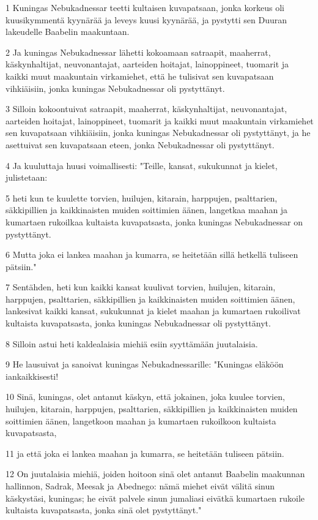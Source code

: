 \par 1 Kuningas Nebukadnessar teetti kultaisen kuvapatsaan, jonka korkeus oli kuusikymmentä kyynärää ja leveys kuusi kyynärää, ja pystytti sen Duuran lakeudelle Baabelin maakuntaan.
\par 2 Ja kuningas Nebukadnessar lähetti kokoamaan satraapit, maaherrat, käskynhaltijat, neuvonantajat, aarteiden hoitajat, lainoppineet, tuomarit ja kaikki muut maakuntain virkamiehet, että he tulisivat sen kuvapatsaan vihkiäisiin, jonka kuningas Nebukadnessar oli pystyttänyt.
\par 3 Silloin kokoontuivat satraapit, maaherrat, käskynhaltijat, neuvonantajat, aarteiden hoitajat, lainoppineet, tuomarit ja kaikki muut maakuntain virkamiehet sen kuvapatsaan vihkiäisiin, jonka kuningas Nebukadnessar oli pystyttänyt, ja he asettuivat sen kuvapatsaan eteen, jonka Nebukadnessar oli pystyttänyt.
\par 4 Ja kuuluttaja huusi voimallisesti: "Teille, kansat, sukukunnat ja kielet, julistetaan:
\par 5 heti kun te kuulette torvien, huilujen, kitarain, harppujen, psalttarien, säkkipillien ja kaikkinaisten muiden soittimien äänen, langetkaa maahan ja kumartaen rukoilkaa kultaista kuvapatsasta, jonka kuningas Nebukadnessar on pystyttänyt.
\par 6 Mutta joka ei lankea maahan ja kumarra, se heitetään sillä hetkellä tuliseen pätsiin."
\par 7 Sentähden, heti kun kaikki kansat kuulivat torvien, huilujen, kitarain, harppujen, psalttarien, säkkipillien ja kaikkinaisten muiden soittimien äänen, lankesivat kaikki kansat, sukukunnat ja kielet maahan ja kumartaen rukoilivat kultaista kuvapatsasta, jonka kuningas Nebukadnessar oli pystyttänyt.
\par 8 Silloin astui heti kaldealaisia miehiä esiin syyttämään juutalaisia.
\par 9 He lausuivat ja sanoivat kuningas Nebukadnessarille: "Kuningas eläköön iankaikkisesti!
\par 10 Sinä, kuningas, olet antanut käskyn, että jokainen, joka kuulee torvien, huilujen, kitarain, harppujen, psalttarien, säkkipillien ja kaikkinaisten muiden soittimien äänen, langetkoon maahan ja kumartaen rukoilkoon kultaista kuvapatsasta,
\par 11 ja että joka ei lankea maahan ja kumarra, se heitetään tuliseen pätsiin.
\par 12 On juutalaisia miehiä, joiden hoitoon sinä olet antanut Baabelin maakunnan hallinnon, Sadrak, Meesak ja Abednego: nämä miehet eivät välitä sinun käskystäsi, kuningas; he eivät palvele sinun jumaliasi eivätkä kumartaen rukoile kultaista kuvapatsasta, jonka sinä olet pystyttänyt."
